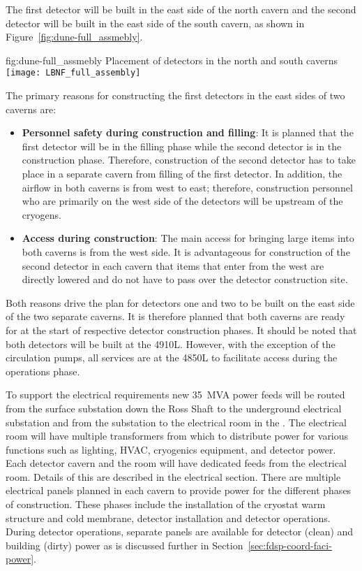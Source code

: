 The first detector will be built in the east side of the north cavern and
the second detector will be built in the east side of the south cavern, as
shown in Figure~\ref{fig:dune-full_assmebly}.
\begin{dunefigure}{fig:dune-full_assmebly}
  {Placement of detectors in the north and south caverns}
  \texttt{[image: LBNF\_full\_assembly]}
\end{dunefigure}
The primary reasons for constructing the first detectors in the east
sides of two caverns are:
\begin{itemize}
\item {\bf Personnel safety during construction and filling}: It is
  planned that the first detector will be in the filling phase while the second detector
  is in the construction phase. Therefore, construction of the 
  second detector has to take place in a separate cavern from
  filling of the first detector. In addition, the airflow in both
  caverns is from west to east; therefore, construction
  personnel who are primarily on the west side of the detectors will
  be upstream of the cryogens.
\item{\bf Access during construction}: The main access for bringing
  large items into both caverns is from the west side. It is
  advantageous for construction of the second detector in each cavern
  that items that enter from the west are directly lowered and do not
  have to pass over the detector construction site.
\end{itemize}
Both reasons drive the plan for detectors one and two to be built on
the east side of the two separate caverns.  It is therefore planned
that both caverns are ready for  at the start of respective
detector construction phases.  It should be noted that both detectors
will be built at the 4910L. However, with the exception of the
 circulation pumps, all services are at the 4850L to
facilitate access during the operations phase.

To support the electrical requirements new 35~MVA power feeds will be
routed from the surface substation down the Ross Shaft to the
underground electrical substation and from the substation to the
electrical room in the .  The electrical room will have
multiple transformers from which to distribute power for various
functions such as lighting, HVAC, cryogenics equipment, and detector  
power.  Each detector cavern and the  room will have
dedicated feeds from the electrical room.  Details of this are
described in the electrical section.  There are multiple electrical
panels planned in each cavern to provide power for the different
phases of construction.  These phases include the installation
of the cryostat warm structure and cold membrane, detector
installation and detector operations. During detector operations, 
separate panels are available for detector (clean) and building
(dirty) power as is discussed further in
Section~\ref{sec:fdsp-coord-faci-power}.

